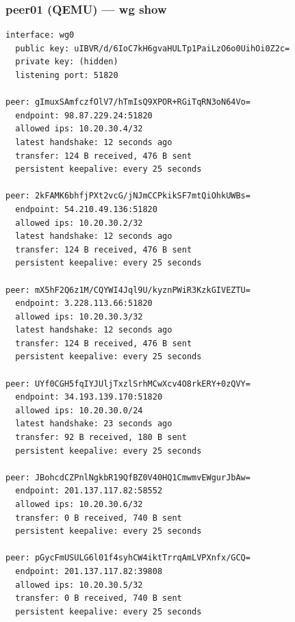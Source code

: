 \documentclass[11pt,a4paper]{article}
\begin{document}
\subsubsection*{peer01 (QEMU) — wg show}
\begin{lstlisting}
interface: wg0
  public key: uIBVR/d/6IoC7kH6gvaHULTp1PaiLzO6o0UihOi0Z2c=
  private key: (hidden)
  listening port: 51820

peer: gImuxSAmfczfOlV7/hTmIsQ9XPOR+RGiTqRN3oN64Vo=
  endpoint: 98.87.229.24:51820
  allowed ips: 10.20.30.4/32
  latest handshake: 12 seconds ago
  transfer: 124 B received, 476 B sent
  persistent keepalive: every 25 seconds

peer: 2kFAMK6bhfjPXt2vcG/jNJmCCPkikSF7mtQiOhkUWBs=
  endpoint: 54.210.49.136:51820
  allowed ips: 10.20.30.2/32
  latest handshake: 12 seconds ago
  transfer: 124 B received, 476 B sent
  persistent keepalive: every 25 seconds

peer: mX5hF2Q6z1M/CQYWI4Jql9U/kyznPWiR3KzkGIVEZTU=
  endpoint: 3.228.113.66:51820
  allowed ips: 10.20.30.3/32
  latest handshake: 12 seconds ago
  transfer: 124 B received, 476 B sent
  persistent keepalive: every 25 seconds

peer: UYf0CGH5fqIYJUljTxzlSrhMCwXcv4O8rkERY+0zQVY=
  endpoint: 34.193.139.170:51820
  allowed ips: 10.20.30.0/24
  latest handshake: 23 seconds ago
  transfer: 92 B received, 180 B sent
  persistent keepalive: every 25 seconds

peer: JBohcdCZPnlNgkbR19QfBZ0V40HQ1CmwmvEWgurJbAw=
  endpoint: 201.137.117.82:58552
  allowed ips: 10.20.30.6/32
  transfer: 0 B received, 740 B sent
  persistent keepalive: every 25 seconds

peer: pGycFmUSULG6l01f4syhCW4iktTrrqAmLVPXnfx/GCQ=
  endpoint: 201.137.117.82:39808
  allowed ips: 10.20.30.5/32
  transfer: 0 B received, 740 B sent
  persistent keepalive: every 25 seconds

\end{lstlisting}
\end{document}
